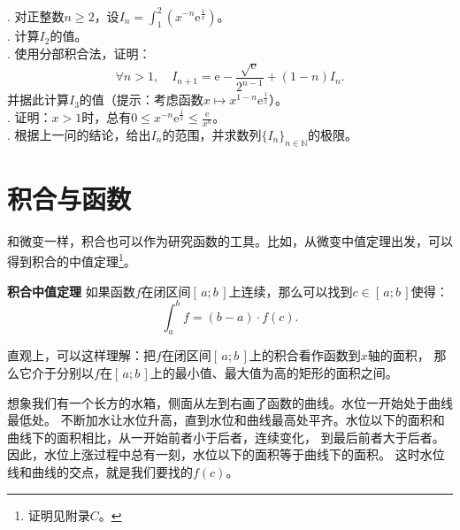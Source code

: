 \documentclass[12pt,UTF8,fontset=none]{ctexbook}
\begin{document}
\begin{xt}
    . 对正整数$n\geqslant 2$，设$\displaystyle I_n = \int_1^2 \left(x^{-n}\mathrm{e}^{\frac{1}{x}}\right)$。\\
    . 计算$I_2$的值。\\
    . 使用分部积合法，证明：
            $$\forall n > 1,\quad I_{n+1} = \mathrm{e} - \frac{\sqrt{\mathrm{e}}}{2^{n-1}} + (1 - n)I_n.$$
    \indent 并据此计算$I_3$的值（提示：考虑函数$x\mapsto x^{1-n}\mathrm{e}^{\frac{1}{x}}$）。\\
    . 证明：$x>1$时，总有$\displaystyle 0\leqslant x^{-n}\mathrm{e}^{\frac{1}{x}} \leqslant \frac{\mathrm{e}}{x^n}$。\\
    . 根据上一问的结论，给出$I_n$的范围，并求数列$\{I_n\}_{n\in\mathbb{N}}$的极限。
\end{xt}

\section{积合与函数}

和微变一样，积合也可以作为研究函数的工具。比如，从微变中值定理出发，可以得到积合的中值定理\footnote{证明见附录$C$。}。

\begin{tm}{\textbf{积合中值定理}}
    如果函数$f$在闭区间$[\,a; b\,]$上连续，那么可以找到$c\in[\,a;b\,]$使得：
    $$ \int_a^b f = (b - a)\cdot f(c).$$
\end{tm}

直观上，可以这样理解：把$f$在闭区间$[\,a; b\,]$上的积合看作函数到$x$轴的面积，
那么它介于分别以$f$在$[\,a; b\,]$上的最小值、最大值为高的矩形的面积之间。

想象我们有一个长方的水箱，侧面从左到右画了函数的曲线。水位一开始处于曲线最低处。
不断加水让水位升高，直到水位和曲线最高处平齐。水位以下的面积和曲线下的面积相比，从一开始前者小于后者，连续变化，
到最后前者大于后者。因此，水位上涨过程中总有一刻，水位以下的面积等于曲线下的面积。
这时水位线和曲线的交点，就是我们要找的$f(c)$。
\end{document}
